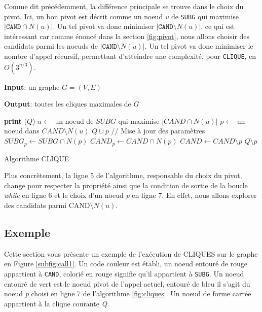 \documentclass[12pt,a4paper]{article}
\begin{document}
Comme dit précédemment, la différence principale se trouve dans le choix du pivot. Ici, un bon pivot est décrit comme un noeud \emph{u} de \texttt{SUBG} qui maximise $ | \texttt{CAND} \cap N(u) |$. Un tel pivot va donc minimiser $ |\texttt{CAND} \setminus N(u)| $, ce qui est intéressant car comme énoncé dans la section \ref{fig:pivot}, nous allons choisir des candidats parmi les noeuds de $ |\texttt{CAND} \setminus N(u)| $. Un tel pivot va donc minimiser le nombre d'appel récursif, permettant d'atteindre une complexité, pour \texttt{CLIQUE}, en $ O(3^{n/3}) $\cite{CONTE20221}.

\begin{algorithm}[H]
  \textbf{Input}: un graphe $G = (V,E)$

  \textbf{Output}: toutes les cliques maximales de $G$
  \begin{algorithmic}[1]
       
        \State \textbf{print} ($ Q $)
      \Else
        \State $u \gets$ un noeud de $SUBG$ qui maximise $|CAND \cap N(u)|$
          \State $p \gets$ un noeud dans $CAND \setminus N(u)$
          \State $ Q \cup p $ 
          \State // Mise à jour des paramètres
          \State $SUBG_p \gets SUBG \cap N(p)$
          \State $CAND_p \gets CAND \cap N(p)$
          \State {}
          \State $CAND \gets CAND \setminus {p}$
          \State $ Q \setminus p $ 
        \EndWhile
      \EndIf
    \EndProcedure
    \State {}
  \end{algorithmic}
  \caption{\label{fig:cliques} Algorithme CLIQUE}
\end{algorithm}

Plus concrètement, la ligne 5 de l'algorithme, responsable du choix du pivot, change pour respecter la propriété ainsi que la condition de sortie de la boucle \emph{while} en ligne 6 et le choix d'un noeud \emph{p} en ligne 7. En effet, nous allons explorer des candidats parmi \(\textrm{CAND} \setminus N(u)\).

\subsection{Exemple}%
\label{subsec:ex}

Cette section vous présente un exemple de l'exécution de CLIQUES sur le graphe en Figure \ref{subfig:call1}.
Un code couleur est établi, un noeud entouré de rouge appartient à \texttt{CAND}, colorié en rouge signifie qu'il appartient à \texttt{SUBG}. Un noeud entouré de vert est le noeud pivot de l'appel actuel, entouré de bleu il s'agit du noeud \emph{p} choisi en ligne 7 de l'algorithme \ref{fig:cliques}. Un noeud de forme carrée appartient à la clique courante \emph{Q}.
\end{document}
